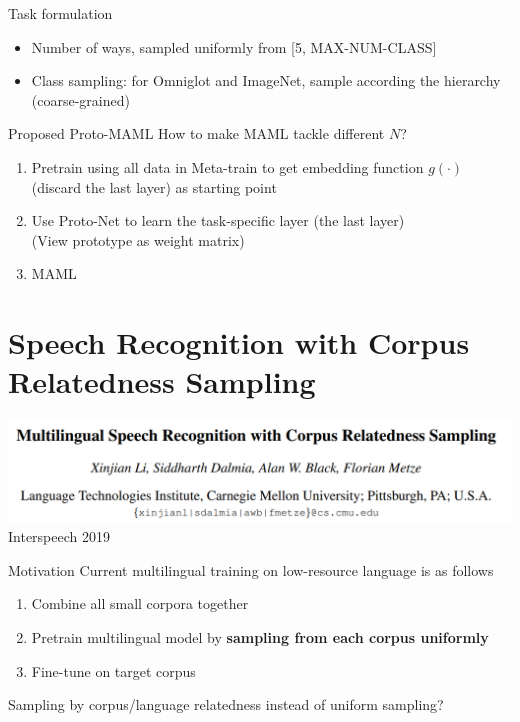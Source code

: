 \documentclass{beamer}
\begin{document}
\begin{frame}{Task formulation}
  \begin{itemize}
    \item Number of ways, sampled uniformly from [5, MAX-NUM-CLASS] 
    \item Class sampling: for Omniglot and ImageNet, sample according the hierarchy (coarse-grained)
  \end{itemize}
\end{frame}

\begin{frame}{Proposed Proto-MAML}
  How to make MAML tackle different $N$?

  \begin{enumerate}[<+->]
    \item Pretrain using all data in Meta-train to get embedding function $g(\cdot)$ \\
      (discard the last layer) as starting point
    \item Use Proto-Net to learn the task-specific layer (the last layer) \\
      (View prototype as weight matrix)
    \item MAML
  \end{enumerate}
\end{frame}



\section{Speech Recognition with Corpus Relatedness Sampling}
\begin{frame}
  \includegraphics[width=\textwidth]{fig/CRS.png}
  \center Interspeech 2019
\end{frame}
\begin{frame}{Motivation}
  Current multilingual training on low-resource language is as follows

  \begin{enumerate}
    \item Combine all small corpora together
    \item Pretrain multilingual model by \textbf{sampling from each corpus uniformly}
    \item Fine-tune on target corpus
  \end{enumerate}

  \pause

  \center Sampling by corpus/language relatedness instead of uniform sampling?
\end{frame}
\end{document}
